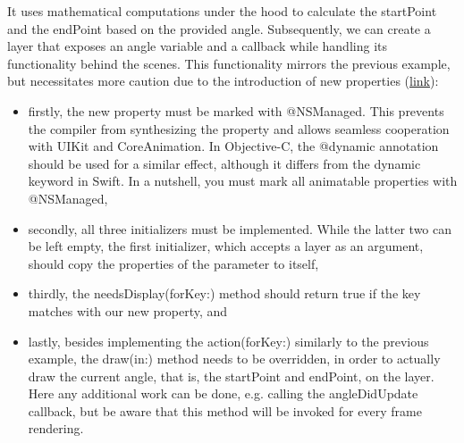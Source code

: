 \documentclass{article}
\begin{document}
It uses mathematical computations under the hood to calculate the startPoint and the endPoint based on the provided angle. Subsequently, we can create a layer that exposes an angle variable and a callback while handling its functionality behind the scenes. This functionality mirrors the previous example, but necessitates more caution due to the introduction of new properties (\href{https://github.com/stateman92/Medium-AnimatableProperties/commit/1b345a3b14d753f345409a642ab56e118d40a29b}{link}):

\begin{itemize}
  \item firstly, the new property must be marked with @NSManaged. This prevents the compiler from synthesizing the property and allows seamless cooperation with UIKit and CoreAnimation. In Objective-C, the @dynamic annotation should be used for a similar effect, although it differs from the dynamic keyword in Swift. In a nutshell, you must mark all animatable properties with @NSManaged,
  \item secondly, all three initializers must be implemented. While the latter two can be left empty, the first initializer, which accepts a layer as an argument, should copy the properties of the parameter to itself,
  \item thirdly, the needsDisplay(forKey:) method should return true if the key matches with our new property, and
  \item lastly, besides implementing the action(forKey:) similarly to the previous example, the draw(in:) method needs to be overridden, in order to actually draw the current angle, that is, the startPoint and endPoint, on the layer. Here any additional work can be done, e.g. calling the angleDidUpdate callback, but be aware that this method will be invoked for every frame rendering.
\end{itemize}
\end{document}

